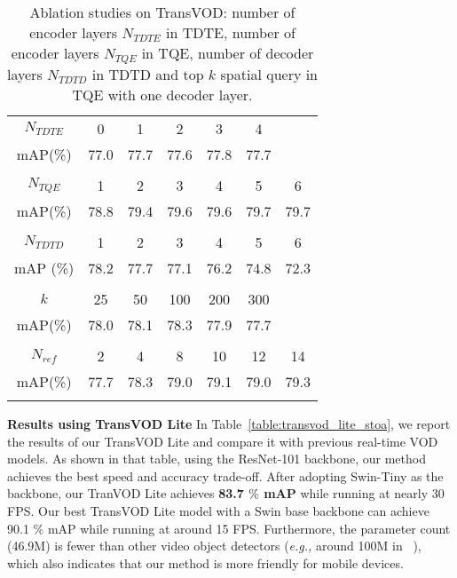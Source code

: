 \documentclass[10pt,journal,compsoc]{IEEEtran}
\begin{document}
\begin{table}[ht]
    \footnotesize
    \begin{center}
    \addtolength{\tabcolsep}{1.5pt}
    \caption{Ablation studies on TransVOD: number of encoder layers $N_{TDTE}$ in TDTE, number of encoder layers $N_{TQE}$ in TQE, number of decoder layers  $N_{TDTD}$ in TDTD and top $k$ spatial query in TQE with one decoder layer.}
    \label{tab:transVOD_ablation_2}
    \begin{tabular}{c|cccccc}
\Xhline{1.0pt}
\multicolumn{7}{c}{(a) {Number of encoder layers $N_{TDTE}$ in TDTE.}}\\
\hline
$N_{TDTE}$ &  0 & 1 & 2 & 3 & 4\\
mAP(\%) & 77.0 & 77.7 & 77.6 & 77.8 & 77.7 \\
\Xhline{1.0pt}
\multicolumn{7}{c}{(b) {number of encoder layers $N_{TQE}$ in TQE}}\\
\hline
$N_{TQE}$ & 1 & 2 & 3  & 4 & 5 & 6\\
mAP(\%)  & 78.8  & 79.4  & 79.6 & 79.6  & 79.7 &  79.7 \\
\Xhline{1.0pt}
\multicolumn{7}{c}{(c) {number of decoder layers  $N_{TDTD}$ in TDTD.}}\\
\hline
$N_{TDTD}$ & 1 & 2  & 3 & 4 & 5 & 6\\
mAP (\%)  & 78.2 & 77.7 & 77.1 & 76.2 & 74.8 & 72.3 \\
\Xhline{1.0pt}
\multicolumn{7}{c}{(d) {top $k$ spatial query in TQE with one decoder layer.}}\\
\hline
$k$ & 25 & 50 & 100  & 200 & 300\\
mAP(\%) & 78.0 & 78.1 & 78.3 & 77.9 &  77.7 \\
\Xhline{1.0pt}
\multicolumn{7}{c}{(d) {Number of reference frames $N_{ref}$.}}\\
\hline
$N_{ref}$  & 2 & 4 & 8  & 10 & 12 & 14\\
mAP(\%) & 77.7 & 78.3  & 79.0  & 79.1 & 79.0& 79.3 \\
\Xhline{1.0pt}
    \end{tabular}
    \end{center}
\end{table}


\noindent
\textbf{Results using TransVOD Lite}
In Table~\ref{table:transvod_lite_stoa}, we report the results of our TransVOD Lite and compare it with previous real-time VOD models. As shown in that table, using the ResNet-101 backbone, our method achieves the best speed and accuracy trade-off. After adopting Swin-Tiny as the backbone, our TranVOD Lite achieves \textbf{83.7 $\%$ mAP} while running at nearly 30 FPS. Our best TransVOD Lite model with a Swin base backbone can achieve 90.1 $\%$ mAP while running at around 15 FPS. Furthermore, the parameter count (46.9M) is fewer than other video object detectors (\emph{e.g.,} around 100M in ~\cite{zhu17dff}), which also indicates that our method is more friendly for mobile devices. 
\end{document}
